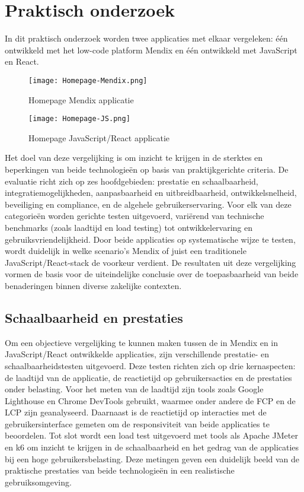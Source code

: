 \section{Praktisch onderzoek}
In dit praktisch onderzoek worden twee applicaties met elkaar vergeleken: één ontwikkeld met het low-code platform Mendix en één ontwikkeld met JavaScript en React. 

\begin{figure}[H]
    \centering
    \texttt{[image: Homepage-Mendix.png]}
    \caption[Homepage Mendix applicatie]{\label{fig:homepage-mendix} Homepage Mendix applicatie }
\end{figure}

\begin{figure}[H]
    \centering
    \texttt{[image: Homepage-JS.png]}
    \caption[Homepage Mendix applicatie]{\label{fig:homepage-JavaScript} Homepage JavaScript/React applicatie }
\end{figure}

Het doel van deze vergelijking is om inzicht te krijgen in de sterktes en beperkingen van beide technologieën op basis van praktijkgerichte criteria. De evaluatie richt zich op zes hoofdgebieden: prestatie en schaalbaarheid, integratiemogelijkheden, aanpasbaarheid en uitbreidbaarheid, ontwikkelsnelheid, beveiliging en compliance, en de algehele gebruikerservaring. Voor elk van deze categorieën worden gerichte testen uitgevoerd, variërend van technische benchmarks (zoals laadtijd en load testing) tot ontwikkelervaring en gebruiksvriendelijkheid. Door beide applicaties op systematische wijze te testen, wordt duidelijk in welke scenario’s Mendix of juist een traditionele JavaScript/React-stack de voorkeur verdient. De resultaten uit deze vergelijking vormen de basis voor de uiteindelijke conclusie over de toepasbaarheid van beide benaderingen binnen diverse zakelijke contexten.
\subsection{Schaalbaarheid en prestaties}
Om een objectieve vergelijking te kunnen maken tussen de in Mendix en in JavaScript/React ontwikkelde applicaties, zijn verschillende prestatie- en schaalbaarheidstesten uitgevoerd. Deze testen richten zich op drie kernaspecten: de laadtijd van de applicatie, de reactietijd op gebruikersacties en de prestaties onder belasting. Voor het meten van de laadtijd zijn tools zoals Google Lighthouse en Chrome DevTools gebruikt, waarmee onder andere de \gls{FCP} en de \gls{LCP} zijn geanalyseerd. Daarnaast is de reactietijd op interacties met de gebruikersinterface gemeten om de responsiviteit van beide applicaties te beoordelen. Tot slot wordt een load test uitgevoerd met tools als Apache JMeter en k6 om inzicht te krijgen in de schaalbaarheid en het gedrag van de applicaties bij een hoge gebruikersbelasting. Deze metingen geven een duidelijk beeld van de praktische prestaties van beide technologieën in een realistische gebruiksomgeving.


